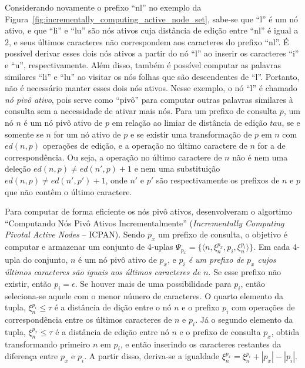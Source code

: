 Considerando novamente o prefixo ``nl'' no exemplo da Figura~\ref{fig:incrementally_computing_active_node_set}, sabe-se que ``l'' é um nó ativo, e que ``li'' e ``lu'' são nós ativos cuja distância de edição entre ``nl'' é igual a $2$, e seus últimos caracteres não correspondem aos caracteres do prefixo ``nl''. É possível derivar esses dois nós ativos a partir do nó ``l'' ao inserir os caracteres ``i'' e ``u'', respectivamente. Além disso, também é possível computar as palavras similares ``li'' e ``lu'' ao visitar os nós folhas que são descendentes de ``l''. Portanto, não é necessário manter esses dois nós ativos. Nesse exemplo, o nó ``l'' é chamado \textit{nó pivô ativo}, pois serve como ``pivô'' para computar outras palavras similares à consulta sem a necessidade de ativar mais nós. Para um prefixo de consulta $p$, um nó $n$ é um nó pivô ativo de $p$ em relação ao limiar de distância de edição $tau$, se e somente se $n$ for um nó ativo de $p$ e se existir uma transformação de $p$ em $n$ com $ed(n,p)$ operações de edição, e a operação no último caractere de $n$ for a de correspondência. Ou seja, a operação no último caractere de $n$ não é nem uma deleção $ed(n,p) \neq ed(n', p) + 1$ e nem uma substituição $ed(n,p) \neq ed(n', p') + 1$, onde $n'$ e $p'$ são respectivamente os prefixos de $n$ e $p$ que não contêm o último caractere. 

Para computar de forma eficiente os nós pivô ativos, \cite{li2011efficient} desenvolveram o algortimo ``Computando Nós Pivô Ativos Incrementalmente'' (\textit{Incrementally Computing Pivotal Active Nodes } -- ICPAN). Sendo $p_{x}$ um prefixo de consulta, o objetivo é computar e armazenar um conjunto de 4-uplas $\Psi_{p_{x}} = \{ \langle n, \xi_{n}^{p_{x}}, p_{i}, \xi_{n}^{p_{i}} \rangle \}$. Em cada 4-upla do conjunto, $n$ é um nó pivô ativo de $p_{x}$, e \textit{$p_{i}$ é um prefixo de $p_{x}$ cujos últimos caracteres são iguais aos últimos caracteres de $n$}. Se esse prefixo não existir, então $p_{i} = \epsilon$. Se houver mais de uma possibilidade para $p_{i}$, então seleciona-se aquele com o menor número de caracteres. O quarto elemento da tupla, $\xi_{n}^{p_{i}} \leq \tau$ é a distância de dição entre o nó $n$ e o prefixo $p_{i}$ com operações de correspondência entre os últimos caracteres de $n$ e $p_{i}$. Já o segundo elemento da tupla, $\xi_{n}^{p_{x}} \leq \tau$ é a distância de edição entre nó $n$ e o prefixo de consulta $p_{x}$, obtida transformando primeiro $n$ em $p_{i}$, e então inserindo os caracteres restantes da diferença entre $p_{x}$ e $p_{i}$. A partir disso, deriva-se a igualdade $\xi_{n}^{p_{x}}=\xi_{n}^{p_{i}} + |p_{x}|-|p_{i}|$.

